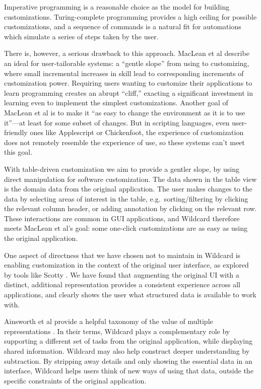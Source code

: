 \documentclass[sigplan,screen,10pt,anonymous,review]{acmart}
\begin{document}
Imperative programming is a reasonable choice as the model for building
customizations. Turing-complete programming provides a high ceiling for
possible customizations, and a sequence of commands is a natural fit for
automations which simulate a series of steps taken by the user.

There is, however, a serious drawback to this approach. MacLean et al
\citep{maclean1990} describe an ideal for user-tailorable systems: a
``gentle slope'' from using to customizing, where small incremental
increases in skill lead to corresponding increments of customization
power. Requiring users wanting to customize their applications to learn
programming creates an abrupt ``cliff,'' exacting a significant
investment in learning even to implement the simplest customizations.
Another goal of MacLean et al is to make it ``as easy to change the
environment as it is to use it''---at least for some subset of changes.
But in scripting languages, even user-friendly ones like Applescript or
Chickenfoot, the experience of customization does not remotely resemble
the experience of use, so these systems can't meet this goal.

With table-driven customization we aim to provide a gentler slope, by
using direct manipulation for software customization. The data shown in
the table view is the domain data from the original application. The
user makes changes to the data by selecting areas of interest in the
table, e.g.~sorting/filtering by clicking the relevant column header, or
adding annotation by clicking on the relevant row. These interactions
are common in GUI applications, and Wildcard therefore meets MacLean et
al's goal: some one-click customizations are as easy as using the
original application.

One aspect of directness that we have chosen not to maintain in Wildcard
is enabling customization in the context of the original user interface,
as explored by tools like Scotty \citep{eagan2011}. We have found that
augmenting the original UI with a distinct, additional representation
provides a consistent experience across all applications, and clearly
shows the user what structured data is available to work with.

Ainsworth et al provide a helpful taxonomy of the value of multiple
representations \citep{ainsworth1999}. In their terms, Wildcard plays a
complementary role by supporting a different set of tasks from the
original application, while displaying shared information. Wildcard may
also help construct deeper understanding by subtraction. By stripping
away details and only showing the essential data in an interface,
Wildcard helps users think of new ways of using that data, outside the
specific constraints of the original application.
\end{document}
